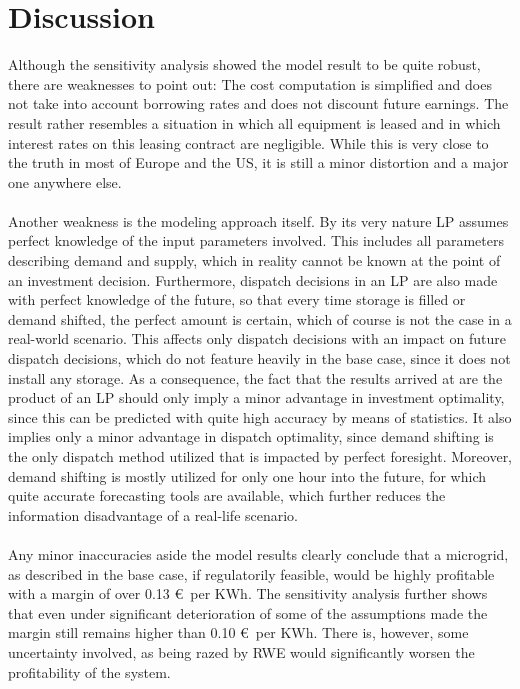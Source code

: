 \documentclass[
	11pt,								%
	DIV10,								%
	a4paper,         					%
	oneside,							%
	headheight=20pt,					%
	footheight=20pt,					%
    parskip=full,						%
    listof=totoc,						%
	bibliography=totoc,					%
	index=totoc,						%
]{scrartcl}
\begin{document}
 
\newpage
{}	
\section{Discussion}
Although the sensitivity analysis showed the model result to be quite robust, there are weaknesses to point out: The cost computation is simplified and does not take into account borrowing rates and does not discount future earnings. The result rather resembles a situation in which all equipment is leased and in which interest rates on this leasing contract are negligible. While this is very close to the truth in most of Europe and the US, it is still a minor distortion and a major one anywhere else.\\\\
Another weakness is the modeling approach itself. By its very nature LP assumes perfect knowledge of the input parameters involved. This includes all parameters describing demand and supply, which in reality cannot be known at the point of an investment decision. Furthermore, dispatch decisions in an LP are also made with perfect knowledge of the future, so that every time storage is filled or demand shifted, the perfect amount is certain, which of course is not the case in a real-world scenario. This affects only dispatch decisions with an impact on future dispatch decisions, which do not feature heavily in the base case, since it does not install any storage. As a consequence, the fact that the results arrived at are the product of an LP should only imply a minor advantage in investment optimality, since this can be predicted with quite high accuracy by means of statistics. It also implies only a minor advantage in dispatch optimality, since demand shifting is the only dispatch method utilized that is impacted by perfect foresight. Moreover, demand shifting is mostly utilized for only one hour into the future, for which quite accurate forecasting tools are available, which further reduces the information disadvantage of a real-life scenario.\\\\
Any minor inaccuracies aside the model results clearly conclude that a microgrid, as described in the base case, if regulatorily feasible, would be highly profitable with a margin of over 0.13 \euro\ per KWh. The sensitivity analysis further shows that even under significant deterioration of some of the assumptions made the margin still remains higher than 0.10 \euro\ per KWh. There is, however, some uncertainty involved, as being razed by RWE would significantly worsen the profitability of the system. \\
\end{document}
